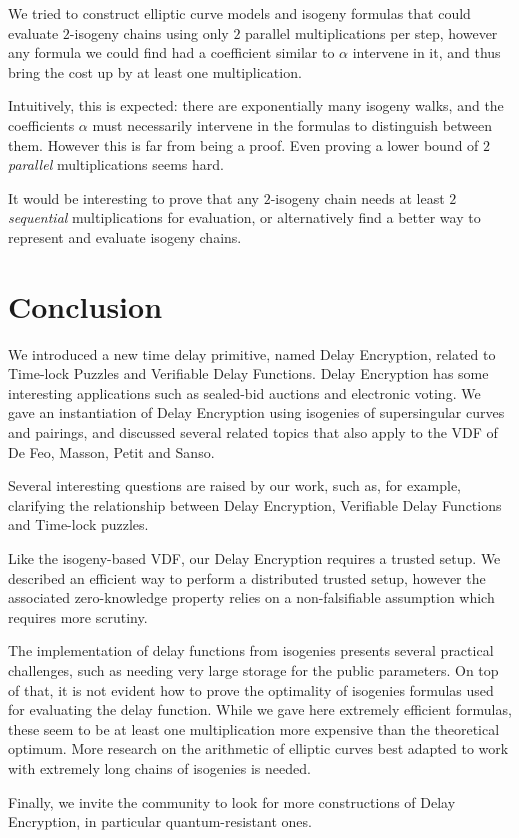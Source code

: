 \documentclass{llncs}
\begin{document}
We tried to construct elliptic curve models and isogeny formulas that
could evaluate $2$-isogeny chains using only $2$ parallel
multiplications per step, however any formula we could find had a
coefficient similar to $\alpha$ intervene in it, and thus bring the
cost up by at least one multiplication.

Intuitively, this is expected: there are exponentially many isogeny
walks, and the coefficients $\alpha$ must necessarily intervene in the
formulas to distinguish between them. %
However this is far from being a proof. %
Even proving a lower bound of $2$ \emph{parallel} multiplications
seems hard.

It would be interesting to prove that any $2$-isogeny chain needs at
least $2$ \emph{sequential} multiplications for evaluation, or
alternatively find a better way to represent and evaluate isogeny
chains.


\section{Conclusion}

We introduced a new time delay primitive, named Delay Encryption,
related to Time-lock Puzzles and Verifiable Delay Functions. %
Delay Encryption has some interesting applications such as sealed-bid
auctions and electronic voting. %
We gave an instantiation of Delay Encryption using isogenies of
supersingular curves and pairings, and discussed several related
topics that also apply to the VDF of De Feo, Masson, Petit and Sanso.

Several interesting questions are raised by our work, such as, for
example, clarifying the relationship between Delay Encryption,
Verifiable Delay Functions and Time-lock puzzles.

Like the isogeny-based VDF, our Delay Encryption requires a trusted
setup. %
We described an efficient way to perform a distributed trusted setup,
however the associated zero-knowledge property relies on a
non-falsifiable assumption which requires more scrutiny.

The implementation of delay functions from isogenies presents several
practical challenges, such as needing very large storage for the
public parameters. %
On top of that, it is not evident how to prove the optimality of
isogenies formulas used for evaluating the delay function. %
While we gave here extremely efficient formulas, these seem to be at
least one multiplication more expensive than the theoretical
optimum. %
More research on the arithmetic of elliptic curves best adapted to
work with extremely long chains of isogenies is needed.

Finally, we invite the community to look for more constructions of
Delay Encryption, in particular quantum-resistant ones.

\def\doi#1{\href{https://doi.org/#1}{\tt https://doi.org/\nolinkurl{#1}}}


\end{document}
